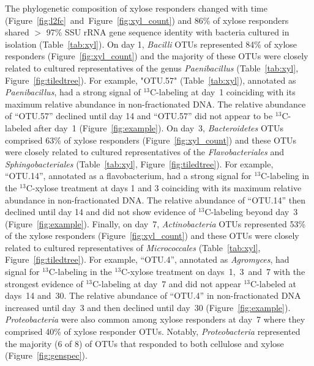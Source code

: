 The phylogenetic composition of xylose responders changed with time
(Figure~\ref{fig:l2fc}~and~Figure~\ref{fig:xyl_count}) and 86\% of xylose responders
shared $>$ 97\% SSU rRNA gene sequence identity with bacteria cultured in
isolation (Table~\ref{tab:xyl}). On day 1, \textit{Bacilli} OTUs represented
84\% of xylose responders (Figure~\ref{fig:xyl_count}) and the majority of
these OTUs were closely related to cultured representatives of the genus
\textit{Paenibacillus} (Table~\ref{tab:xyl}, Figure~\ref{fig:tiledtree}). For
example, "OTU.57" (Table~\ref{tab:xyl}), annotated as \textit{Paenibacillus},
had a strong signal of $^{13}$C-labeling at day~1 coinciding with its
maximum relative abundance in non-fractionated DNA. The relative abundance
of ``OTU.57'' declined until day 14 and ``OTU.57'' did not appear to be
$^{13}$C-labeled after day~1 (Figure~\ref{fig:example}). On day~3,
\textit{Bacteroidetes} OTUs comprised 63\% of xylose responders
(Figure~\ref{fig:xyl_count}) and these OTUs were closely related to
cultured representatives of the \textit{Flavobacteriales} and
\textit{Sphingobacteriales} (Table~\ref{tab:xyl},
Figure~\ref{fig:tiledtree}). For example, ``OTU.14'', annotated as
a flavobacterium, had a strong signal for $^{13}$C-labeling in the
$^{13}$C-xylose treatment at days 1 and 3 coinciding with its maximum
relative abundance in non-fractionated DNA. The relative abundance of
``OTU.14'' then declined until day 14 and did not show evidence of
$^{13}$C-labeling beyond day~3 (Figure~\ref{fig:example}). Finally, on
day~7, \textit{Actinobacteria} OTUs represented 53\% of the xylose
responders (Figure~\ref{fig:xyl_count}) and these OTUs were closely
related to cultured representatives of \textit{Micrococcales}
(Table~\ref{tab:xyl}, Figure~\ref{fig:tiledtree}). For example, ``OTU.4'',
annotated as \textit{Agromyces}, had signal for $^{13}$C-labeling in the
$^{13}$C-xylose treatment on days~1,~3~and~7 with the strongest evidence
of $^{13}$C-labeling at day~7 and did not appear $^{13}$C-labeled at
days~14 and~30. The relative abundance of ``OTU.4'' in non-fractionated
DNA increased until day~3 and then declined until day~30
(Figure~\ref{fig:example}). \textit{Proteobacteria} were also common among
xylose responders at day~7 where they comprised 40\% of xylose responder
OTUs. Notably, \textit{Proteobacteria} represented the majority (6 of 8)
of OTUs that responded to both cellulose and xylose
(Figure~\ref{fig:genspec}). 

